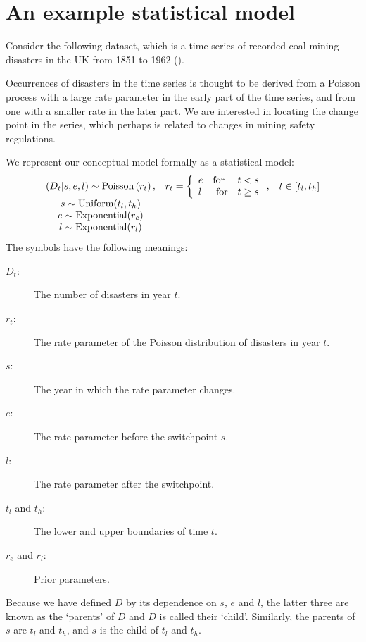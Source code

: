 

\section*{An example statistical model}
Consider the following dataset, which is a time series of recorded coal mining disasters in the UK from 1851 to 1962 (\cite{Jarrett:1979fr}).
\begin{center}
\end{center}
Occurrences of disasters in the time series is thought to be derived from a Poisson process with a large rate parameter in the early part of the time series, and from one with a smaller rate in the later part. We are interested in locating the change point in the series, which perhaps is related to changes in mining safety regulations.

We represent our conceptual model formally as a statistical model:
\begin{equation}
    \begin{array}{ccc}
        (D_t | s, e, l) \sim \textup{Poisson}\left(r_t\right), & r_t=\left\{\begin{array}{lll}
            e &\text{for}& t< s\\ l &\text{ for}& t\ge s
            \end{array}\right.,&t\in[t_l,t_h]\\
        s\sim \textup{Uniform}(t_l, t_h)\\
        e\sim \textup{Exponential}(r_e)\\
        l\sim \textup{Exponential}(r_l)        
    \end{array}
    \label{disastermodel} 
\end{equation}
The symbols have the following meanings:
\begin{description}
    \item[$D_t$:] The number of disasters in year $t$.
    \item[$r_t$:] The rate parameter of the Poisson distribution of disasters in year $t$.
    \item[$s$:] The year in which the rate parameter changes.
    \item[$e$:] The rate parameter before the switchpoint $s$.
    \item[$l$:] The rate parameter after the switchpoint.
    \item[$t_l$ and $t_h$:] The lower and upper boundaries of time $t$.
    \item[$r_e$ and $r_l$:] Prior parameters.
\end{description}
Because we have defined $D$ by its dependence on $s$, $e$ and $l$, the latter three are known as the `parents' of $D$ and $D$ is called their `child'. Similarly, the parents of $s$ are $t_l$ and $t_h$, and $s$ is the child of $t_l$ and $t_h$.

